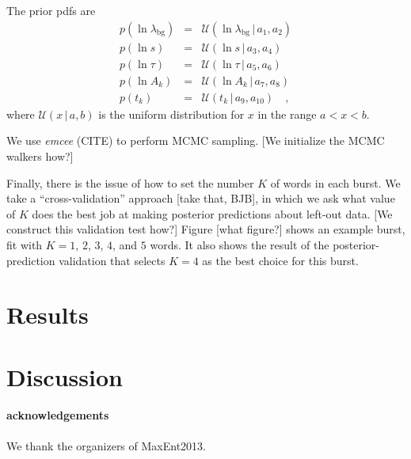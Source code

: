 \documentclass[12pt]{emulateapj}
\newcommand{\project}[1]{\textsl{#1}}
\newcommand{\given}{\,|\,}
\newcommand{\Uniform}{{\mathcal U}}
\newcommand{\bg}{\mathrm{bg}}
\begin{document}
The prior pdfs are
\begin{eqnarray}
p(\ln\lambda_{\bg}) &=& \Uniform(\ln\lambda_{\bg}\given a_1, a_2)
\\
p(\ln s) &=& \Uniform(\ln s\given a_3, a_4)
\\
p(\ln\tau) &=& \Uniform(\ln\tau\given a_5, a_6)
\\
p(\ln A_k) &=& \Uniform(\ln A_k\given a_7, a_8)
\\
p(t_k) &=& \Uniform(t_k\given a_9, a_{10})
\quad,
\end{eqnarray}
where $\Uniform(x\given a, b)$ is the uniform distribution for $x$ in the range $a<x<b$.

We use \project{emcee} (CITE) to perform MCMC sampling.
[We initialize the MCMC walkers how?]

Finally, there is the issue of how to set the number $K$ of words in each burst.
We take a ``cross-validation'' approach [take that, BJB],
  in which we ask what value of $K$ does the best job at making posterior predictions
  about left-out data.
[We construct this validation test how?]
Figure [what figure?] shows an example burst,
  fit with $K=1$, $2$, $3$, $4$, and $5$ words.
It also shows the result of the posterior-prediction validation
  that selects $K=4$ as the best choice for this burst.

\section{Results}

\section{Discussion}


\paragraph{acknowledgements}
We thank the organizers of MaxEnt2013.
\end{document}
